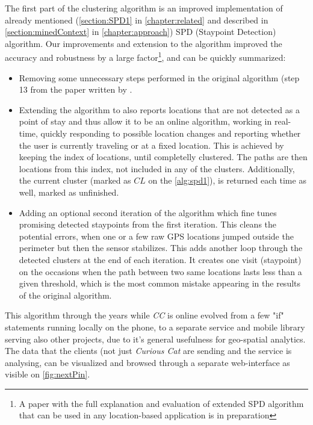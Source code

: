 The first part of the clustering algorithm is an improved implementation of
already mentioned (\autoref{section:SPD1} in \autoref{chapter:related} and
described in \autoref{section:minedContext} in \autoref{chapter:approach})
SPD (Staypoint Detection) algorithm\parencite{Kang2005}. Our improvements
and extension to the algorithm improved the accuracy and robustness by a
large factor\footnote{A paper with the full explanation and evaluation of 
extended SPD algorithm that can be used in any location-based application is 
in preparation}, and can be quickly summarized:
\begin{itemize}
\item Removing some unnecessary steps performed in the original algorithm (step
13 from the paper written by \textcite{Kang2005}.
\item Extending the algorithm to also reports locations that are not detected
as a point of stay and thus allow it to be an online algorithm, working in
real-time, quickly responding to possible location changes and reporting 
whether the user is currently traveling or at a fixed location. This is achieved
by keeping the index of locations, until completelly clustered. The paths
are then locations from this index, not included in any of the clusters. 
Additionally, the current cluster (marked as $CL$ on the \autoref{alg:spd1}),
is returned each time as well, marked as unfinished.
\item Adding an optional second iteration of the algorithm which fine tunes
promising detected staypoints from the first iteration. This cleans the 
potential errors, when one or a few raw GPS locations jumped outside the 
perimeter but then the sensor stabilizes. This adds another loop through
the detected clusters at the end of each iteration. It creates one visit
(staypoint) on the occasions when the path between two same locations lasts 
less than a given threshold, which is the most common mistake appearing in the
results of the original algorithm.
\end{itemize}

This algorithm through the years while \emph{CC} is online evolved from a few
"if" statements running locally on the phone, to a separate service and mobile
library serving also other projects, due to it's general usefulness for 
geo-spatial analytics. The data that the clients (not just \emph{Curious Cat}
are sending and the service is analysing, can be visualized and browsed through
a separate web-interface as visible on \autoref{fig:nextPin}.

